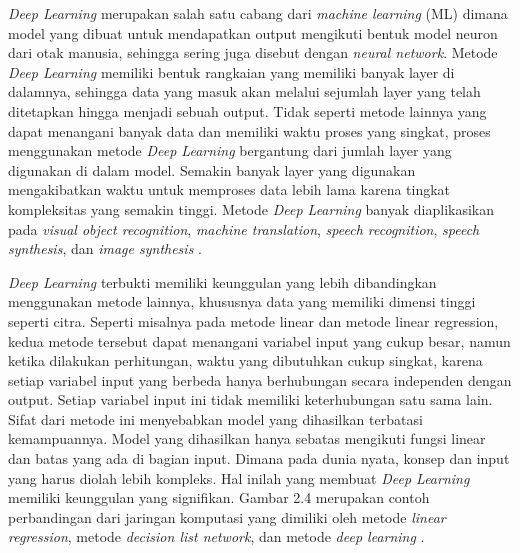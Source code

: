 \emph{Deep Learning} merupakan salah satu cabang dari \emph{machine learning} (ML) dimana model yang dibuat untuk mendapatkan output 
mengikuti bentuk model neuron dari otak manusia, sehingga sering juga disebut dengan \emph{neural network}. Metode \emph{Deep Learning} 
memiliki bentuk rangkaian yang memiliki banyak layer di dalamnya, sehingga data yang masuk akan melalui sejumlah layer yang telah ditetapkan 
hingga menjadi sebuah output. Tidak seperti metode lainnya yang dapat menangani banyak data dan memiliki waktu proses yang singkat, proses 
menggunakan metode \emph{Deep Learning} bergantung dari jumlah layer yang digunakan di dalam model. Semakin banyak layer yang digunakan mengakibatkan 
waktu untuk memproses data lebih lama karena tingkat kompleksitas yang semakin tinggi. Metode \emph{Deep Learning} banyak diaplikasikan pada 
\emph{visual object recognition}, \emph{machine translation}, \emph{speech recognition}, \emph{speech synthesis}, dan \emph{image synthesis} 
\parencite{Russel2021}.

\emph{Deep Learning} terbukti memiliki keunggulan yang lebih dibandingkan menggunakan \linebreak metode lainnya, khususnya data yang memiliki dimensi 
tinggi seperti citra. Seperti misalnya pada metode linear dan metode linear regression, kedua metode tersebut dapat menangani variabel input 
yang cukup besar, namun ketika dilakukan perhitungan, waktu yang dibutuhkan cukup singkat, karena setiap variabel input yang berbeda hanya 
berhubungan secara independen dengan output. Setiap variabel input ini tidak memiliki keterhubungan satu sama lain. Sifat dari metode ini 
menyebabkan model yang dihasilkan terbatasi kemampuannya. Model yang dihasilkan hanya sebatas mengikuti fungsi linear dan batas yang ada di 
bagian input. Dimana pada dunia nyata, konsep dan input yang harus diolah lebih kompleks. Hal inilah yang membuat \emph{Deep Learning} memiliki 
keunggulan yang signifikan. Gambar 2.4 merupakan contoh perbandingan dari jaringan komputasi yang dimiliki oleh metode \emph{linear regression}, metode 
\emph{decision list network}, dan metode \emph{deep learning} \parencite{Russel2021}. 

